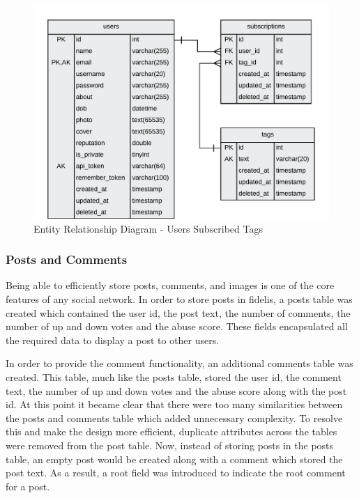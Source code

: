 \begin{figure}[H]
  \centering
  \includegraphics[width=1.0\textwidth]{Images/Design/Database/Subscriptions}
  \caption{Entity Relationship Diagram - Users Subscribed Tags} \label{fig:ERD_Subscriptions}
\end{figure}

\subsubsection{Posts and Comments}
Being able to efficiently store posts, comments, and images is one of the core features of any social network. In order to store posts in fidelis, a posts table was created which contained the user id, the post text, the number of comments, the number of up and down votes and the abuse score. These fields encapsulated all the required data to display a post to other users.

In order to provide the comment functionality, an additional comments table was created. This table, much like the posts table, stored the user id, the comment text, the number of up and down votes and the abuse score along with the post id. At this point it became clear that there were too many similarities between the posts and comments table which added unnecessary complexity. To resolve this and make the design more efficient, duplicate attributes across the tables were removed from the post table. Now, instead of storing posts in the posts table, an empty post would be created along with a comment which stored the post text. As a result, a root field was introduced to indicate the root comment for a post.

